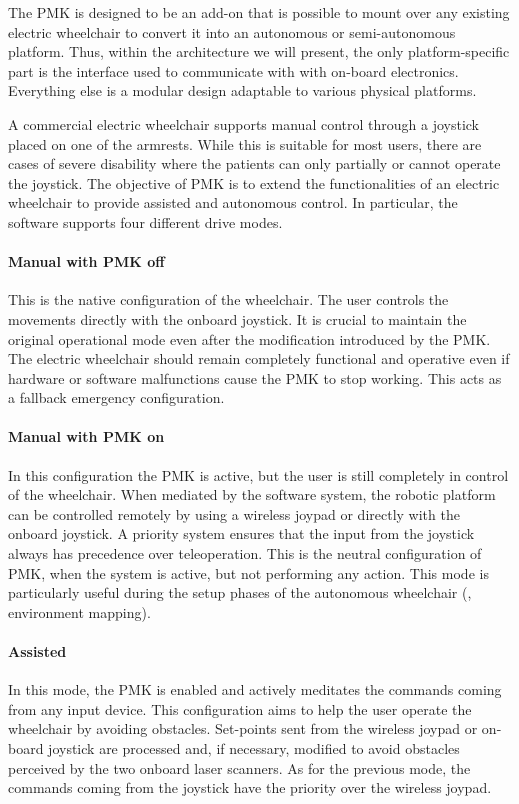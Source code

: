 The PMK is designed to be an add-on that is possible to mount over any existing electric wheelchair to convert it into an autonomous or semi-autonomous platform. Thus, within the architecture we will present, the only platform-specific part is the interface used to communicate with with on-board electronics. Everything else is a modular design adaptable to various physical platforms.

A commercial electric wheelchair supports manual control through a joystick placed on one of the armrests. While this is suitable for most users, there are cases of severe disability where the patients can only partially or cannot operate the joystick. The objective of PMK is to extend the functionalities of an electric wheelchair to provide assisted and autonomous control. In particular, the software supports four different drive modes.

\paragraph{Manual with PMK off} This is the native configuration of the wheelchair. The user controls the movements directly with the onboard joystick. It is crucial to maintain the original operational mode even after the modification introduced by the PMK. The electric wheelchair should remain completely functional and operative even if hardware or software malfunctions cause the PMK to stop working. This acts as a fallback emergency configuration.
\paragraph{Manual with PMK on} In this configuration the PMK is active, but the user is still completely in control of the wheelchair. When mediated by the software system, the robotic platform can be controlled remotely by using a wireless joypad or directly with the onboard joystick. A priority system ensures that the input from the joystick always has precedence over teleoperation. This is the neutral configuration of PMK, when the system is active, but not performing any action. This mode is particularly useful during the setup phases of the autonomous wheelchair (\eg, environment mapping).
\paragraph{Assisted} In this mode, the PMK is enabled and actively meditates the commands coming from any input device. This configuration aims to help the user operate the wheelchair by avoiding obstacles. Set-points sent from the wireless joypad or on-board joystick are processed and, if necessary, modified to avoid obstacles perceived by the two onboard laser scanners. As for the previous mode, the commands coming from the joystick have the priority over the wireless joypad.
